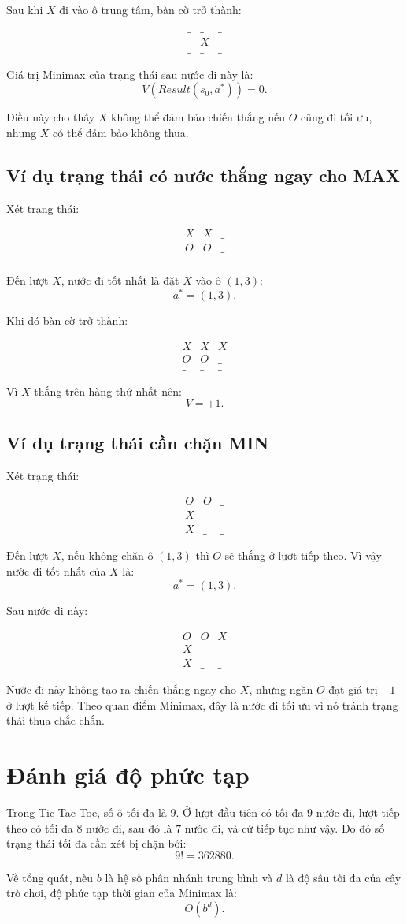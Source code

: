 \documentclass[12pt,a4paper]{article}
\newcommand{\blank}{\_}
\newcommand{\board}[9]{
\[
\begin{array}{c|c|c}
#1 & #2 & #3\\ \hline
#4 & #5 & #6\\ \hline
#7 & #8 & #9
\end{array}
\]
}
\begin{document}
Sau khi $X$ đi vào ô trung tâm, bàn cờ trở thành:
\board{\blank}{\blank}{\blank}{\blank}{X}{\blank}{\blank}{\blank}{\blank}

Giá trị Minimax của trạng thái sau nước đi này là:
\[
V(Result(s_0,a^*))=0.
\]

Điều này cho thấy $X$ không thể đảm bảo chiến thắng nếu $O$ cũng đi tối ưu, nhưng $X$ có thể đảm bảo không thua.

\subsection{Ví dụ trạng thái có nước thắng ngay cho MAX}

Xét trạng thái:
\board{X}{X}{\blank}{O}{O}{\blank}{\blank}{\blank}{\blank}

Đến lượt $X$, nước đi tốt nhất là đặt $X$ vào ô $(1,3)$:
\[
a^*=(1,3).
\]

Khi đó bàn cờ trở thành:
\board{X}{X}{X}{O}{O}{\blank}{\blank}{\blank}{\blank}

Vì $X$ thắng trên hàng thứ nhất nên:
\[
V=+1.
\]

\subsection{Ví dụ trạng thái cần chặn MIN}

Xét trạng thái:
\board{O}{O}{\blank}{X}{\blank}{\blank}{X}{\blank}{\blank}

Đến lượt $X$, nếu không chặn ô $(1,3)$ thì $O$ sẽ thắng ở lượt tiếp theo.
Vì vậy nước đi tốt nhất của $X$ là:
\[
a^*=(1,3).
\]

Sau nước đi này:
\board{O}{O}{X}{X}{\blank}{\blank}{X}{\blank}{\blank}

Nước đi này không tạo ra chiến thắng ngay cho $X$, nhưng ngăn $O$ đạt giá trị $-1$ ở lượt kế tiếp.
Theo quan điểm Minimax, đây là nước đi tối ưu vì nó tránh trạng thái thua chắc chắn.

\section{Đánh giá độ phức tạp}

Trong Tic-Tac-Toe, số ô tối đa là $9$.
Ở lượt đầu tiên có tối đa $9$ nước đi, lượt tiếp theo có tối đa $8$ nước đi, sau đó là $7$ nước đi, và cứ tiếp tục như vậy.
Do đó số trạng thái tối đa cần xét bị chặn bởi:
\[
9! = 362880.
\]

Về tổng quát, nếu $b$ là hệ số phân nhánh trung bình và $d$ là độ sâu tối đa của cây trò chơi, độ phức tạp thời gian của Minimax là:
\[
O(b^d).
\]
\end{document}
